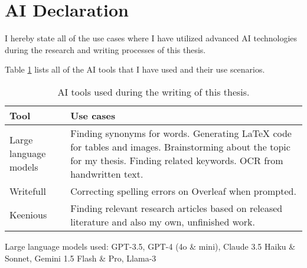 



\chapter*{AI Declaration\label{extra:declaration}}

I hereby state all of the use cases where I have utilized advanced AI technologies during the research and writing processes of this thesis.

Table \ref{table:declaration} lists all of the AI tools that I have used and their use scenarios.

\begin{table}[h]
  \centering
  \begin{tabularx}{\textwidth}{>{\hsize=0.3\hsize}X >{\hsize=0.7\hsize}X}  
    \hline
    \textbf{Tool} & \textbf{Use cases} \\
    \hline
    Large language models & Finding synonyms for words. Generating LaTeX code for tables and images. Brainstorming about the topic for my thesis. Finding related keywords. OCR from handwritten text.\\
    \hline
    Writefull& Correcting spelling errors on Overleaf when prompted. \\
    \hline
    Keenious & Finding relevant research articles based on released literature and also my own, unfinished work. \\
    \hline
  \end{tabularx}
  \caption{AI tools used during the writing of this thesis.}
  \label{table:declaration}
\end{table}

Large language models used: GPT-3.5, GPT-4 (4o \& mini), Claude 3.5 Haiku \& Sonnet, Gemini 1.5 Flash \& Pro, Llama-3